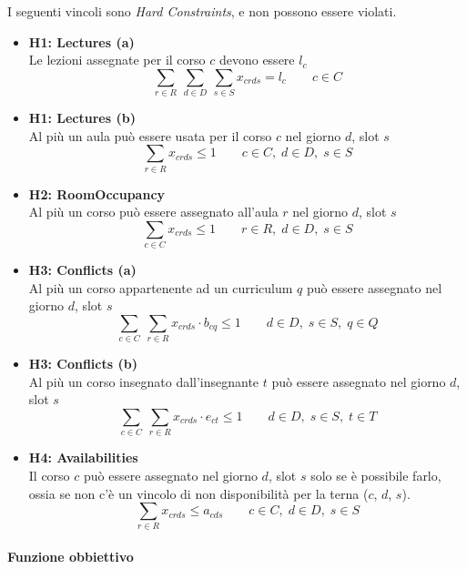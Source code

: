 \documentclass[]{article}
\begin{document}
I seguenti vincoli sono \textit{Hard Constraints}, e non possono essere violati.

\begin{itemize}
	\item \textbf{H1: Lectures (a)} \mbox{}\\
Le lezioni assegnate per il corso $c$ devono essere $l_c$
\[ \sum_{r \in R} \: \sum_{d \in D} \: \sum_{s \in S} x_{crds} = l_c  \qquad c \in C \]

	\item \textbf{H1: Lectures (b)}  \mbox{}\\
Al più un aula può essere usata per il corso $c$ nel giorno $d$, slot $s$
\[ \sum_{r \in R}  x_{crds} \le 1  \qquad c \in C, \; d \in D, \; s \in S \]

	\item \textbf{H2: RoomOccupancy}  \mbox{}\\
Al più un corso può essere assegnato all'aula $r$ nel giorno $d$, slot $s$
\[ \sum_{c \in C}  x_{crds} \le 1  \qquad r \in R, \; d \in D, \; s \in S \]

	\item \textbf{H3: Conflicts (a)}  \mbox{}\\
Al più un corso appartenente ad un curriculum $q$ può essere assegnato nel giorno $d$, slot $s$
\[ \sum_{c \in C} \: \sum_{r \in R}  x_{crds} \cdot b_{cq} \le 1  \qquad d \in D, \; s \in S, \; q \in Q \]

	\item \textbf{H3: Conflicts (b)}  \mbox{}\\
Al più un corso insegnato dall'insegnante $t$ può essere assegnato nel giorno $d$, slot $s$
\[ \sum_{c \in C} \: \sum_{r \in R}  x_{crds} \cdot e_{ct} \le 1  \qquad d \in D, \; s \in S, \; t \in T \]

	\item \textbf{H4: Availabilities}  \mbox{}\\
Il corso $c$ può essere assegnato nel giorno $d$, slot $s$ solo se è possibile farlo, ossia se non c'è un vincolo di non disponibilità per la terna ($c$, $d$, $s$).
\[ \sum_{r \in R}  x_{crds} \le a_{cds}  \qquad c \in C, \; d \in D, \; s \in S \]

\end{itemize}


\paragraph{Funzione obbiettivo} \mbox{}\\
\end{document}
